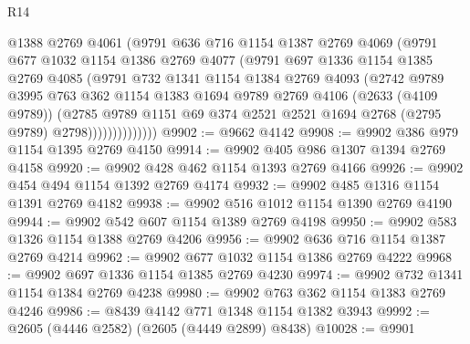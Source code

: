 \begin{lexlean}{R14}
\begin{coremodule}
                    @1388
                    @2769
                    @4061
                    (@9791
                      @636
                      @716
                      @1154
                      @1387
                      @2769
                      @4069
                      (@9791
                        @677
                        @1032
                        @1154
                        @1386
                        @2769
                        @4077
                        (@9791
                          @697
                          @1336
                          @1154
                          @1385
                          @2769
                          @4085
                          (@9791
                            @732
                            @1341
                            @1154
                            @1384
                            @2769
                            @4093
                            (@2742
                              @9789
                              @3995
                              @763
                              @362
                              @1154
                              @1383
                              @1694
                              @9789
                              @2769
                              @4106
                              (@2633 (@4109 @9789))
                              (@2785
                                @9789
                                @1151
                                @69
                                @374
                                @2521
                                @2521
                                @1694
                                @2768
                                (@2795 @9789)
                                @2798))))))))))))))
@9902 := @9662 @4142
@9908 := @9902 @386 @979 @1154 @1395 @2769 @4150
@9914 := @9902 @405 @986 @1307 @1394 @2769 @4158
@9920 := @9902 @428 @462 @1154 @1393 @2769 @4166
@9926 := @9902 @454 @494 @1154 @1392 @2769 @4174
@9932 := @9902 @485 @1316 @1154 @1391 @2769 @4182
@9938 := @9902 @516 @1012 @1154 @1390 @2769 @4190
@9944 := @9902 @542 @607 @1154 @1389 @2769 @4198
@9950 := @9902 @583 @1326 @1154 @1388 @2769 @4206
@9956 := @9902 @636 @716 @1154 @1387 @2769 @4214
@9962 := @9902 @677 @1032 @1154 @1386 @2769 @4222
@9968 := @9902 @697 @1336 @1154 @1385 @2769 @4230
@9974 := @9902 @732 @1341 @1154 @1384 @2769 @4238
@9980 := @9902 @763 @362 @1154 @1383 @2769 @4246
@9986 := @8439 @4142 @771 @1348 @1154 @1382 @3943
@9992 := @2605 (@4446 @2582) (@2605 (@4449 @2899) @8438)
@10028 := @9901

\end{coremodule}
\end{lexlean}
